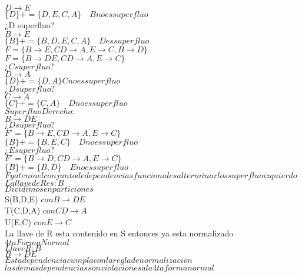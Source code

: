 \documentclass{article}
\begin{document}
\begin{enumerate}
    $D\rightarrow E$\\
    $\{D\}+=\{D,E,C,A\} \quad B no es superfluo$\\
    ¿D superfluo?\\
    $B\rightarrow E$\\
    $\{B\}+=\{B,D,E,C,A\} \quad D es superfluo$\\
    $F=\{B \rightarrow E, CD \rightarrow A, E \rightarrow C, B\rightarrow D\}$\\
    $F=\{B \rightarrow DE, CD \rightarrow A, E \rightarrow C\}$\\
    $¿C superfluo?$\\
    $D\rightarrow A$\\
    $\{D\}+=\{D,A\} C no es superfluo$\\
    $¿D superfluo?$\\
    $C \rightarrow A$\\
    $\{C\}+=\{C,A\} \quad D no es superfluo$\\
    $Superfluo Derecho:$\\
    $B \rightarrow DE$\\
    $¿D superfluo?$\\
    $F'=\{B \rightarrow E, CD \rightarrow A, E\rightarrow C\}$\\
    $\{B\}+=\{B,E,C\} \quad D no es superfluo$\\
    $¿E superfluo?$\\
    $F'=\{B \rightarrow D, CD \rightarrow A, E \rightarrow C\}$\\
    $\{B\}+=\{B,D\} \quad E no es superfluo$\\
    $F ya tenia el conjunto de dependencias funcionales al terminar los superfluo izquierdo$\\
    $La llave de R es: B$\\
    $Dividimos en particiones$\\
    S(B,D,E) $con B \rightarrow DE$\\
    T(C,D,A) $con CD \rightarrow A$\\
    U(E,C) $con E \rightarrow C$\\
    La llave de R esta contenido en S entonces ya esta normalizado\\
    $4ta Forma Normal$\\
    $Llave R: B$\\
    $B\rightarrow DE$ \\$Esta dependencia cumpla con la regla de normalizacion$\\
    $las demas dependencias son violaciones a la 4ta forma normal$\\

\end{enumerate}
\end{document}
